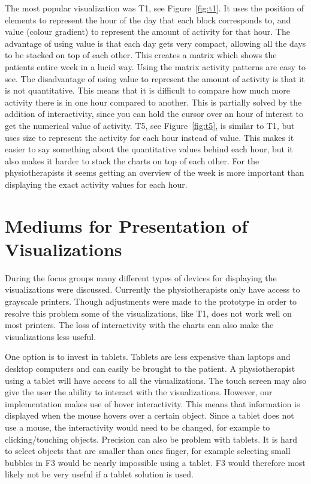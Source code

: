 The most popular visualization was T1, see Figure~\ref{fig:t1}. It uses the position of elements to represent the hour of the day that each block corresponds to, and value (colour gradient) to represent the amount of activity for that hour. The advantage of using value is that each day gets very compact, allowing all the days to be stacked on top of each other. This creates a matrix which shows the patients entire week in a lucid way. Using the matrix activity patterns are easy to see. The disadvantage of using value to represent the amount of activity is that it is not quantitative. This means that it is difficult to compare how much more activity there is in one hour compared to another. This is partially solved by the addition of interactivity, since you can hold the cursor over an hour of interest to get the numerical value of activity. T5, see Figure~\ref{fig:t5}, is similar to T1, but uses size to represent the activity for each hour instead of value. This makes it easier to say something about the quantitative values behind each hour, but it also makes it harder to stack the charts on top of each other. For the physiotherapists it seems getting an overview of the week is more important than displaying the exact activity values for each hour. 

\section{Mediums for Presentation of Visualizations}
During the focus groups many different types of devices for displaying the visualizations were discussed. Currently the physiotherapists only have access to grayscale printers. Though adjustments were made to the prototype in order to resolve this problem some of the visualizations, like T1, does not work well on most printers. The loss of interactivity with the charts can also make the visualizations less useful.

One option is to invest in tablets. Tablets are less expensive than laptops and desktop computers and can easily be brought to the patient. A physiotherapist using a tablet will have access to all the visualizations. The touch screen may also give the user the ability to interact with the visualizations. However, our implementation makes use of hover interactivity. This means that information is displayed when the mouse hovers over a certain object. Since a tablet does not use a mouse, the interactivity would need to be changed, for example to clicking/touching objects. Precision can also be problem with tablets. It is hard to select objects that are smaller than ones finger, for example selecting small bubbles in F3 would be nearly impossible using a tablet. F3 would therefore most likely not be very useful if a tablet solution is used. 

